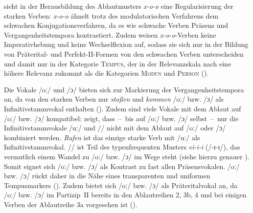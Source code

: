 \textcite[178]{Nowak.2013} sieht in der Herausbildung des Ablautmusters \textit{x-o-o} eine  Regulari\-sierung der starken Verben: \textit{x-o-o} ähnelt trotz des modulatorischen Verfahrens dem schwachen Konjugationsverfahren, da es wie schwache Verben Präsens und Vergangenheitstempora kontrastiert. Zudem weisen \textit{x-o-o}-Verben keine Imperativhebung und keine Wechselflexion auf, sodass sie sich nur in der Bildung von Präterital- und Perfekt-II-Formen von den schwachen Verben unterscheiden und damit nur in der Kategorie \textsc{Tempus}, der in der Relevanzskala nach \textcite[33--37]{Bybee.1985} eine höhere Relevanz zukommt als die Kategorien \textsc{Modus} und \textsc{Person} (\cite[192]{Nubling.1998}). 



Die Vokale /oː/ und /ɔ/ bieten sich zur Markierung der Vergangenheitstempora an, da von den starken Verben nur \textit{stoßen} und \textit{kommen} /oː/ bzw. /ɔ/ als Infinitivstammvokal enthalten (\cite[136]{Nowak.2016}). Zudem sind viele Vokale mit dem Ablaut auf /oː/ bzw. /ɔ/ kompatibel: \textcite[136]{Nowak.2016} zeigt, dass~--~bis auf /oː/ bzw. /ɔ/ selbst~--~nur die Infinitivstammvokale /uː/ und /{}/ nicht mit dem Ablaut auf /oː/ oder /ɔ/ kombiniert werden. \textit{Rufen} ist das einzige starke Verb mit /uː/ als Infinitivstammvokal. /{}/ ist Teil des typenfrequenten Musters \textit{ei-i-i} (/{}-ɪ-ɪ/), das vermutlich einem Wandel zu /oː/ bzw. /ɔ/ im Wege steht (siehe hierzu genauer ). Somit eignet sich /oː/ bzw. /ɔ/ als Kontrast zu fast allen Präsensvokalen. /oː/ bzw. /ɔ/ rückt daher in die Nähe eines transparenten und uniformen Tempusmarkers (\cite[136--137]{Nowak.2016}). Zudem bietet sich /oː/ bzw. /ɔ/ als Präteritalvokal an, da /oː/ bzw. /ɔ/ im Partizip~II bereits in den Ablautreihen 2, 3b, 4 und bei einigen Verben der Ablautreihe 3a vorgesehen ist (\cite[167]{Nowak.2018}).

